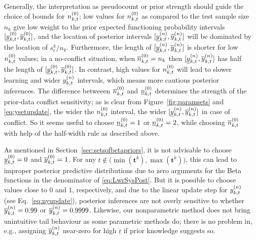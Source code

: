 \documentclass[12pt, a4paper]{elsarticle}
\newcommand{\bs}[1]{\boldsymbol{#1}}
\renewcommand{\vec}[1]{{\bs#1}}
\begin{document}
Generally, the interpretation as pseudocount or prior strength should guide the choice of bounds for $n^{(0)}_{k,t}$; 
low values for $n^{(0)}_{k,t}$ as compared to the test sample size $n_k$
give low weight to the prior expected functioning probability intervals $[\underline{y}^{(0)}_{k,t}, \overline{y}^{(0)}_{k,t}]$,
and the location of posterior intervals $[\underline{y}^{(n)}_{k,t}, \overline{y}^{(n)}_{k,t}]$ will be dominated by the location of $s^k_t/n_k$.
Furthermore, the length of $[\underline{y}^{(n)}_{k,t}, \overline{y}^{(n)}_{k,t}]$ is shorter for low $n^{(0)}_{k,t}$ values;
in a no-conflict situation, when $\overline{n}^{(0)}_{k,t} = n_k$ then $[\underline{y}^{(n)}_{k,t}, \overline{y}^{(n)}_{k,t}]$ has half the length of $[\underline{y}^{(0)}_{k,t}, \overline{y}^{(0)}_{k,t}]$.
In contrast, high values for $n^{(0)}_{k,t}$ will lead to slower learning and wider $y^{(n)}_{k,t}$ intervals,
which means more cautious posterior inferences.
The difference betweeen $\overline{n}^{(0)}_{k,t}$ and $\underline{n}^{(0)}_{k,t}$ determines the strength of the prior-data conflict sensitivity;
as is clear from Figure~\ref{fig:paramsets} and \eqref{eq:ysetupdate}, the wider the $n^{(0)}_{k,t}$ interval,
the wider $[\underline{y}^{(n)}_{k,t}, \overline{y}^{(n)}_{k,t}]$ in case of conflict.
So it seems useful to choose $\underline{n}^{(0)}_{k,t} = 1$ or $\underline{n}^{(0)}_{k,t} = 2$,
while choosing $\overline{n}^{(0)}_{k,t}$ with help of the half-width rule as described above.

As mentioned in Section~\ref{sec:setsofbetapriors},
it is not advisable to choose $\underline{y}^{(0)}_{k,t} = 0$ and $\overline{y}^{(0)}_{k,t} = 1$.
For any $t \not\in \big(\min(\vec{t}^k), \max(\vec{t}^k)\big)$,
this can lead to improper posterior predictive distributions
due to zero arguments for the Beta functions in the denominator of \eqref{eq:LwrSysPost}.
But it is possible to choose values close to $0$ and $1$, respectively,
and due to the linear update step for $y^{(n)}_{k,t}$ (see Eq.~\eqref{eq:nyupdate}),
posterior inferences are not overly sensitive to whether $\overline{y}^{(n)}_{k,t} = 0.99$ or $\overline{y}^{(n)}_{k,t} = 0.9999$.
Likewise, our nonparametric method does not bring unintuitive tail behaviour
as some parametric methods do;
there is no problem in, e.g., assigning $\overline{y}^{(n)}_{k,t}$ near-zero for high $t$ if prior knowledge suggests so.
\end{document}
